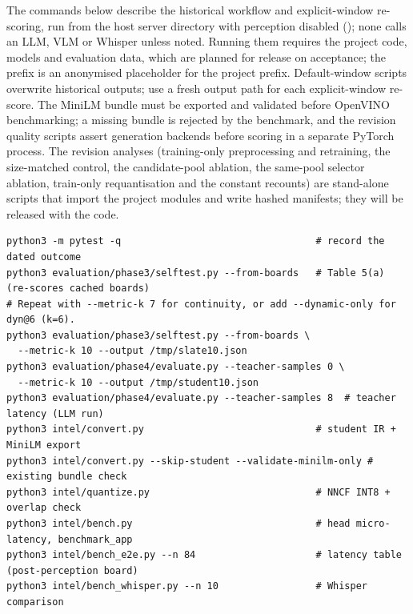 The commands below describe the historical workflow and explicit-window re-scoring, run from the host server directory with perception disabled (); none calls an LLM, VLM or Whisper unless noted. Running them requires the project code, models and evaluation data, which are planned for release on acceptance; the  prefix is an anonymised placeholder for the project prefix. Default-window scripts overwrite historical outputs; use a fresh output path for each explicit-window re-score. The MiniLM bundle must be exported and validated before OpenVINO benchmarking; a missing bundle is rejected by the benchmark, and the revision quality scripts assert generation backends before scoring in a separate PyTorch process. %
The revision analyses (training-only preprocessing and retraining, the size-matched control, the candidate-pool ablation, the same-pool selector ablation, train-only requantisation and the constant recounts) are stand-alone scripts that import the project modules and write hashed manifests; they will be released with the code.
\begin{footnotesize}
\begin{verbatim}
python3 -m pytest -q                                  # record the dated outcome
python3 evaluation/phase3/selftest.py --from-boards   # Table 5(a) (re-scores cached boards)
# Repeat with --metric-k 7 for continuity, or add --dynamic-only for dyn@6 (k=6).
python3 evaluation/phase3/selftest.py --from-boards \
  --metric-k 10 --output /tmp/slate10.json
python3 evaluation/phase4/evaluate.py --teacher-samples 0 \
  --metric-k 10 --output /tmp/student10.json
python3 evaluation/phase4/evaluate.py --teacher-samples 8  # teacher latency (LLM run)
python3 intel/convert.py                              # student IR + MiniLM export
python3 intel/convert.py --skip-student --validate-minilm-only # existing bundle check
python3 intel/quantize.py                             # NNCF INT8 + overlap check
python3 intel/bench.py                                # head micro-latency, benchmark_app
python3 intel/bench_e2e.py --n 84                     # latency table (post-perception board)
python3 intel/bench_whisper.py --n 10                 # Whisper comparison
\end{verbatim}
\end{footnotesize}

